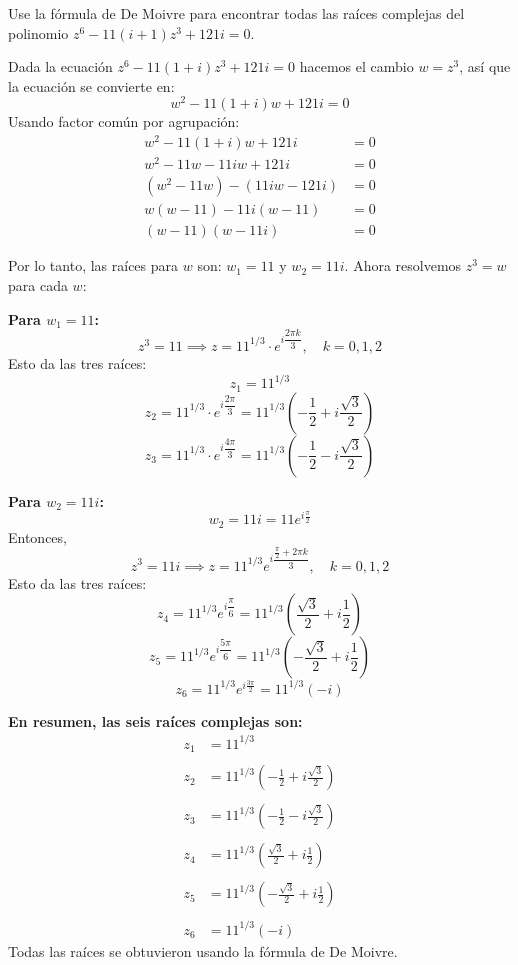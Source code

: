 \begin{prob}Use la fórmula de De Moivre para encontrar todas las raíces complejas del polinomio $z^6-11(i+1)z^3+121i=0$.
\begin{myproof}
Dada la ecuación \(
z^6 - 11(1+i)z^3 + 121i = 0
\) hacemos el cambio $w = z^3$, así que la ecuación se convierte en:
\[
w^2 - 11(1+i)w + 121i = 0
\]
Usando factor común por agrupación: \begin{align*}
w^2 - 11(1+i)w + 121i &= 0 \\
w^2 - 11w - 11iw + 121i &= 0 \\
(w^2 - 11w) - (11iw - 121i) &= 0 \\
w(w - 11) -11i(w - 11) &= 0 \\
(w - 11)(w - 11i) &= 0
\end{align*}

Por lo tanto, las raíces para $w$ son: \(
w_1 = 11 \) y \(w_2 = 11i.\) Ahora resolvemos $z^3 = w$ para cada $w$:

\textbf{Para $w_1 = 11$:}
\[
z^3 = 11 \implies z = 11^{1/3} \cdot e^{i\dfrac{2\pi k}{3}}, \quad k=0,1,2
\]
Esto da las tres raíces:
\[
z_1 = 11^{1/3}
\]
\[
z_2 = 11^{1/3} \cdot e^{i\dfrac{2\pi}{3}} = 11^{1/3} \left(-\frac{1}{2} + i\frac{\sqrt{3}}{2}\right)
\]
\[
z_3 = 11^{1/3} \cdot e^{i\dfrac{4\pi}{3}} = 11^{1/3} \left(-\frac{1}{2} - i\frac{\sqrt{3}}{2}\right)
\]

\textbf{Para $w_2 = 11i$:}
\[
w_2 = 11i = 11 e^{i\frac{\pi}{2}}
\]
Entonces,
\[
z^3 = 11i \implies z = 11^{1/3} e^{i\dfrac{\frac{\pi}{2} + 2\pi k}{3}}, \quad k=0,1,2
\]
Esto da las tres raíces:
\[
z_4 = 11^{1/3} e^{i\dfrac{\pi}{6}} = 11^{1/3} \left(\frac{\sqrt{3}}{2} + i\frac{1}{2}\right)
\]
\[
z_5 = 11^{1/3} e^{i\dfrac{5\pi}{6}} = 11^{1/3} \left(-\frac{\sqrt{3}}{2} + i\frac{1}{2}\right)
\]
\[
z_6 = 11^{1/3} e^{i\frac{3\pi}{2}} = 11^{1/3} (-i)
\]

\textbf{En resumen, las seis raíces complejas son:}
\[
\boxed{
\begin{aligned}
z_1 &= 11^{1/3} \\\\
z_2 &= 11^{1/3} \left(-\frac{1}{2} + i\frac{\sqrt{3}}{2}\right) \\\\
z_3 &= 11^{1/3} \left(-\frac{1}{2} - i\frac{\sqrt{3}}{2}\right) \\\\
z_4 &= 11^{1/3} \left(\frac{\sqrt{3}}{2} + i\frac{1}{2}\right) \\\\
z_5 &= 11^{1/3} \left(-\frac{\sqrt{3}}{2} + i\frac{1}{2}\right) \\\\
z_6 &= 11^{1/3} (-i)
\end{aligned}
}
\]
Todas las raíces se obtuvieron usando la fórmula de De Moivre.
\end{myproof}
\end{prob}

